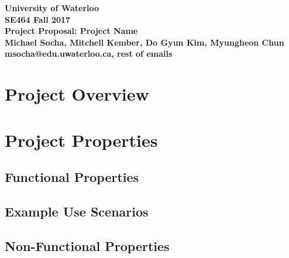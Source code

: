 \documentclass[12pt]{article}
\begin{document}
\begin{center}
\vspace*{\fill}
{\Large\bf University of Waterloo}\\
\vspace{3mm}
{\Large\bf SE464 Fall 2017}\\
\vspace{3mm}
{\large\bf Project Proposal: Project Name}\\
\vspace{3mm}
{\large\bf Michael Socha, Mitchell Kember, Do Gyun Kim, Myungheon Chun}\\
\vspace{3mm}
{\large\bf msocha@edu.uwaterloo.ca, rest of emails}\\
\vspace*{\fill}
\end{center}

\newpage

\section{Project Overview}

\newpage

\section{Project Properties}
\subsection{Functional Properties}
\subsection{Example Use Scenarios}
\subsection{Non-Functional Properties}
\end{document}
